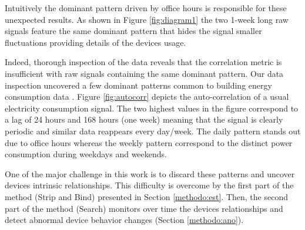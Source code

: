 Intuitively the dominant pattern driven by office hours is responsible for these unexpected results.
As shown in Figure \ref{fig:diagram1} the two 1-week long raw signals feature the same dominant pattern that hides the signal smaller fluctuations providing details of the devices usage.

Indeed, thorough inspection of the data reveals that the correlation metric is insufficient with raw signals containing the same dominant pattern.
Our data inspection uncovered a few dominant patterns common to building energy consumption data \cite{wrinch:pes2012}.
Figure \ref{fig:autocorr} depicts the auto-correlation of a usual electricity consumption signal.
The two highest values in the figure correspond to a lag of 24 hours and 168 hours (one week) meaning that the signal is clearly periodic and similar data reappears every day/week.
The daily pattern stands out due to office hours whereas the weekly pattern correspond to the distinct power consumption during weekdays and weekends.

One of the major challenge in this work is to discard these patterns and uncover devices intrinsic relationships.
This difficulty is overcome by the first part of the method (Strip and Bind) presented in Section \ref{methodo:est}.
Then, the second part of the method (Search) monitors over time the devices relationships and detect abnormal device behavior changes (Section \ref{methodo:ano}).
